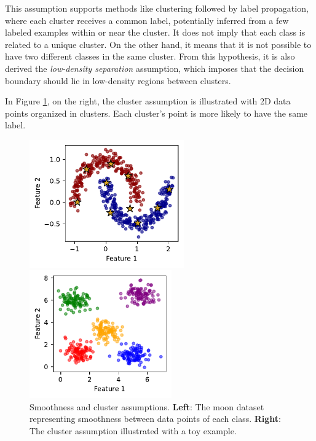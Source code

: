This assumption supports methods like clustering followed by label propagation, 
where each cluster receives a common label, potentially inferred from a few 
labeled examples within or near the cluster.
It does not imply that each class is related to a unique cluster. 
On the other hand, it means that it is not possible to have two different classes 
in the same cluster.
From this hypothesis, it is also derived the \emph{low-density separation} 
assumption, which imposes that the decision boundary should lie in low-density
regions between clusters.

In Figure \ref{fig:moon_cluster}, on the right, the cluster assumption is 
illustrated with 2D data points organized in clusters. Each cluster's point is 
more likely to have the same label.
\begin{figure}[h]
    \centering
    \begin{minipage}{0.5\textwidth}
        \centering
        \includegraphics[height=5.5cm]{images/ssl/moon.pdf} %
    \end{minipage}\hfill
    \begin{minipage}{0.44\textwidth}
        \centering
        \includegraphics[height=5.5cm]{images/ssl/clusters.pdf} %
    \end{minipage}
    \caption [Illustration of the smoothness and cluster assumptions.]
    {Smoothness and cluster assumptions. \textbf{Left}: The moon dataset representing smoothness between 
        data points of each class. \textbf{Right}: The cluster assumption 
        illustrated with a toy example.}
    \label{fig:moon_cluster}
    \end{figure}
